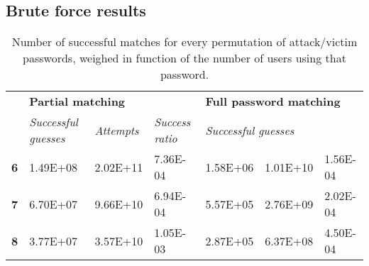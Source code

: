 \documentclass[british,11pt,a4paper]{article}
\begin{document}
\begin{appendices}
	\section{Brute force results}\label{app:bruteforceresults}
	\begin{table}[h]
	\centering
	\begin{tabular}{l|l|l|l|l|l|l|}
	\cline{2-7}
	 & \multicolumn{3}{l|}{\textbf{Partial matching}} & \multicolumn{3}{l|}{\textbf{Full password matching}} \\ \cline{2-7} 
	 & \textit{Successful guesses} & \textit{Attempts} & \textit{Success ratio} & \multicolumn{3}{l|}{\textit{Successful guesses}} \\ \hline
	\multicolumn{1}{|l|}{\textbf{6}} & 1.49E+08 & 2.02E+11 & 7.36E-04 & 1.58E+06 & 1.01E+10 & 1.56E-04 \\ \hline
	\multicolumn{1}{|l|}{\textbf{7}} & 6.70E+07 & 9.66E+10 & 6.94E-04 & 5.57E+05 & 2.76E+09 & 2.02E-04 \\ \hline
	\multicolumn{1}{|l|}{\textbf{8}} & 3.77E+07 & 3.57E+10 & 1.05E-03 & 2.87E+05 & 6.37E+08 & 4.50E-04 \\ \hline
	\end{tabular}
	\caption{Number of successful matches for every permutation of attack/victim passwords, weighed in function of the number of users using that password.}
	\label{tab:brute_force}
	\end{table}

\end{appendices}
\clearpage
\end{document}
